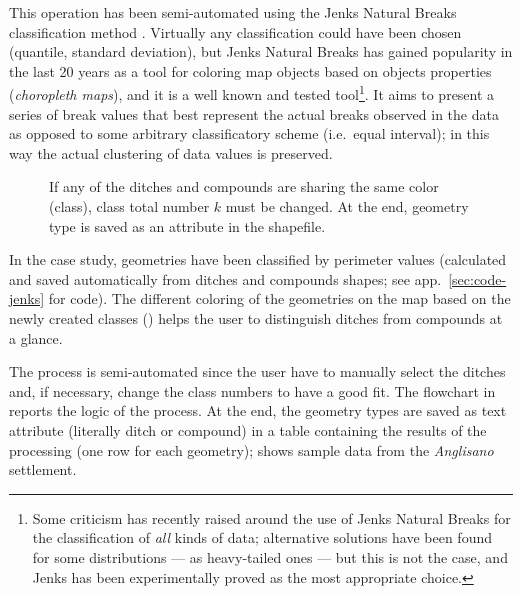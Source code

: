            This operation has been semi-automated using the Jenks Natural Breaks classification method \cite{jenks1977}. Virtually any classification could have been chosen (quantile, standard deviation), but Jenks Natural Breaks has gained popularity in the last 20 years as a tool for coloring map objects based on objects properties (\emph{choropleth maps}), and it is a well known and tested tool\footnote{Some criticism has recently raised around the use of Jenks Natural Breaks for the classification of \emph{all} kinds of data; alternative solutions have been found for some distributions --- as heavy-tailed ones \cite{jenks-tail} --- but this is not the case, and Jenks has been experimentally proved as the most appropriate choice.}. It aims to present a series of break values that best represent the actual breaks observed in the data as opposed to some arbitrary classificatory scheme (i.e.\ equal interval); in this way the actual clustering of data values is preserved.

            \begin{wrapfigure}{l}{0.5\textwidth}
                \centering
                \vspace{-0.03\textheight}
                \begin{tikzpicture}[x=1mm,y=1mm,scale=0.005]
                    
                \end{tikzpicture}
                \caption[Flow chart: the logic of bulk distinguishing ditches and compounds]{If any of the ditches and compounds are sharing the same color (class), class total number $k$ must be changed. At the end, geometry type is saved as an attribute in the shapefile.}
                \label{fig:flow-map}
                \vspace{-0.03\textheight}
            \end{wrapfigure}

            In the case study, geometries have been classified by perimeter values (calculated and saved automatically from ditches and compounds shapes; see app.~\ref{sec:code-jenks} for code). The different coloring of the geometries on the map based on the newly created classes () helps the user to distinguish ditches from compounds at a glance.

            The process is semi-automated since the user have to manually select the ditches and, if necessary, change the class numbers to have a good fit. The flowchart in  reports the logic of the process. At the end, the geometry types are saved as text attribute (literally \textsf{ditch} or \textsf{compound}) in a table containing the results of the processing (one row for each geometry);  shows sample data from the \emph{Anglisano} settlement.

